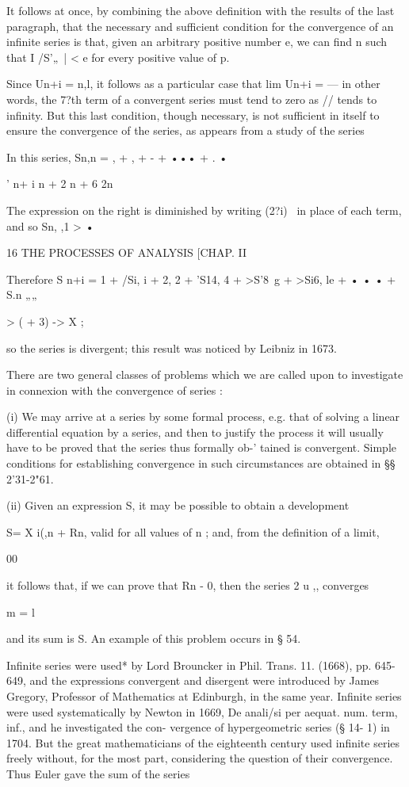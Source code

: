 It follows at once, by combining the above definition with the results
of the last paragraph, that the necessary and sufficient condition for
the convergence of an infinite series is that, given an arbitrary
positive number e, we can find n such that I /S'„\ | < e for every
positive value of p.

Since Un+i = n,l, it follows as a particular case that lim Un+i = — in
other words, the 7?th term of a convergent series must tend to zero as
// tends to infinity. But this last condition, though necessary, is
not sufficient in itself to ensure the convergence of the series, as
appears from a study of the series

In this series, Sn,n = , + , + - + ••• + . •

' n+ i n + 2 n + 6 2n

The expression on the right is diminished by writing (2?i)~ in place
of each term, and so Sn, ,1 > •



16 THE PROCESSES OF ANALYSIS [CHAP. II

Therefore S n+i = 1 + /Si, i + 2, 2 + 'S14, 4 + >S'8\ g + >Si6, le + •
• • + S.n „„

> ( + 3) -> X ;

so the series is divergent; this result was noticed by Leibniz in
1673.

There are two general classes of problems which we are called upon to
investigate in connexion with the convergence of series :

(i) We may arrive at a series by some formal process, e.g. that of
solving a linear differential equation by a series, and then to
justify the process it will usually have to be proved that the series
thus formally ob-' tained is convergent. Simple conditions for
establishing convergence in such circumstances are obtained in §§
2'31-2"61.

(ii) Given an expression S, it may be possible to obtain a development

S= X i(,n + Rn, valid for all values of n ; and, from the definition
of a limit,

00

it follows that, if we can prove that Rn - 0, then the series 2 u ,,
converges

m = l

and its sum is S. An example of this problem occurs in § 54.

Infinite series were used* by Lord Brouncker in Phil. Trans. 11.
(1668), pp. 645-649, and the expressions convergent and disergent were
introduced by James Gregory, Professor of Mathematics at Edinburgh, in
the same year. Infinite series were used systematically by Newton in
1669, De anali/si per aequat. num. term, inf., and he investigated the
con- vergence of hypergeometric series (§ 14- 1) in 1704. But the
great mathematicians of the eighteenth century used infinite series
freely without, for the most part, considering the question of their
convergence. Thus Euler gave the sum of the series


